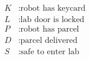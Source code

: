 \documentclass[preview,border=4pt]{standalone}
\begin{document}
\begin{align*}
        K &: \text{robot has keycard}\\
        L &: \text{lab door is locked}\\
        P &: \text{robot has parcel}\\
        D &: \text{parcel delivered}\\
        S &: \text{safe to enter lab}
      \end{align*}
\end{document}
